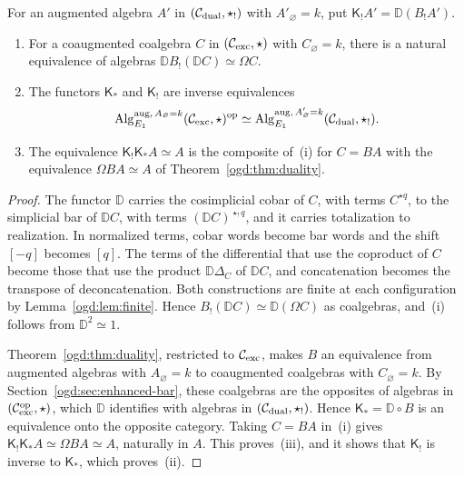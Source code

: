 \begin{theorem}\label{ogd:thm:polarity}
For an augmented algebra \(A'\) in \((\mathcal C_{\mathrm{dual}},\star_!)\) with \(A'_\varnothing=k\), put \(\mathsf K_!A'=\mathbb D(B_!A')\).
\begin{enumerate}
\item For a coaugmented coalgebra \(C\) in \((\mathcal C_{\mathrm{exc}},\star)\) with \(C_\varnothing=k\), there is a natural equivalence of algebras \(\mathbb DB_!(\mathbb DC)\simeq\Omega C\).
\item The functors \(\mathsf K_*\) and \(\mathsf K_!\) are inverse equivalences
\[
 \operatorname{Alg}^{\mathrm{aug},\,A_\varnothing=k}_{E_1}(\mathcal C_{\mathrm{exc}},\star)^{\mathrm{op}}
 \simeq
 \operatorname{Alg}^{\mathrm{aug},\,A'_\varnothing=k}_{E_1}(\mathcal C_{\mathrm{dual}},\star_!).
\]
\item The equivalence \(\mathsf K_!\mathsf K_*A\simeq A\) is the composite of~(i) for \(C=BA\) with the equivalence \(\Omega BA\simeq A\) of Theorem~\ref{ogd:thm:duality}.
\end{enumerate}
\end{theorem}
\begin{proof}
The functor \(\mathbb D\) carries the cosimplicial cobar of \(C\), with terms \(C^{\star q}\), to the simplicial bar of \(\mathbb DC\), with terms \((\mathbb DC)^{\star_!q}\), and it carries totalization to realization.
In normalized terms, cobar words become bar words and the shift \([-q]\) becomes \([q]\).
The terms of the differential that use the coproduct of \(C\) become those that use the product \(\mathbb D\Delta_C\) of \(\mathbb DC\), and concatenation becomes the transpose of deconcatenation.
Both constructions are finite at each configuration by Lemma~\ref{ogd:lem:finite}.
Hence \(B_!(\mathbb DC)\simeq\mathbb D(\Omega C)\) as coalgebras, and~(i) follows from \(\mathbb D^2\simeq1\).

Theorem~\ref{ogd:thm:duality}, restricted to \(\mathcal C_{\mathrm{exc}}\), makes \(B\) an equivalence from augmented algebras with \(A_\varnothing=k\) to coaugmented coalgebras with \(C_\varnothing=k\).
By Section~\ref{ogd:sec:enhanced-bar}, these coalgebras are the opposites of algebras in \((\mathcal C_{\mathrm{exc}}^{\mathrm{op}},\star)\), which \(\mathbb D\) identifies with algebras in \((\mathcal C_{\mathrm{dual}},\star_!)\).
Hence \(\mathsf K_*=\mathbb D\circ B\) is an equivalence onto the opposite category.
Taking \(C=BA\) in~(i) gives \(\mathsf K_!\mathsf K_*A\simeq\Omega BA\simeq A\), naturally in \(A\).
This proves~(iii), and it shows that \(\mathsf K_!\) is inverse to \(\mathsf K_*\), which proves~(ii).
\end{proof}

